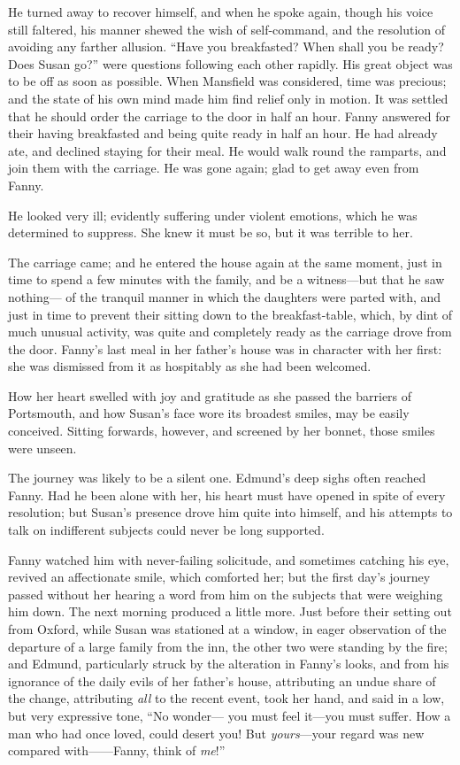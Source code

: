 \documentclass{article}
\newcommand{\gdash}{{---}{---}}
\begin{document}
He turned away to recover himself, and when he spoke again,
though his voice still faltered, his manner shewed
the wish of self-command, and the resolution of avoiding
any farther allusion.  ``Have you breakfasted?  When shall
you be ready?  Does Susan go?'' were questions following
each other rapidly.  His great object was to be off
as soon as possible.  When Mansfield was considered,
time was precious; and the state of his own mind made
him find relief only in motion.  It was settled that he
should order the carriage to the door in half an hour.
Fanny answered for their having breakfasted and being quite
ready in half an hour.  He had already ate, and declined
staying for their meal.  He would walk round the ramparts,
and join them with the carriage.  He was gone again;
glad to get away even from Fanny.

He looked very ill; evidently suffering under
violent emotions, which he was determined to suppress.
She knew it must be so, but it was terrible to her.

The carriage came; and he entered the house again at
the same moment, just in time to spend a few minutes with
the family, and be a witness---but that he saw nothing---%
of the tranquil manner in which the daughters were
parted with, and just in time to prevent their sitting
down to the breakfast-table, which, by dint of much
unusual activity, was quite and completely ready as
the carriage drove from the door.  Fanny's last meal
in her father's house was in character with her first:
she was dismissed from it as hospitably as she had been welcomed.

How her heart swelled with joy and gratitude as she
passed the barriers of Portsmouth, and how Susan's face
wore its broadest smiles, may be easily conceived.
Sitting forwards, however, and screened by her bonnet,
those smiles were unseen.

The journey was likely to be a silent one.  Edmund's deep
sighs often reached Fanny.  Had he been alone with her,
his heart must have opened in spite of every resolution;
but Susan's presence drove him quite into himself, and his
attempts to talk on indifferent subjects could never be
long supported.

Fanny watched him with never-failing solicitude,
and sometimes catching his eye, revived an affectionate smile,
which comforted her; but the first day's journey passed
without her hearing a word from him on the subjects
that were weighing him down.  The next morning produced
a little more.  Just before their setting out from Oxford,
while Susan was stationed at a window, in eager observation
of the departure of a large family from the inn,
the other two were standing by the fire; and Edmund,
particularly struck by the alteration in Fanny's looks,
and from his ignorance of the daily evils of her
father's house, attributing an undue share of the change,
attributing \emph{all} to the recent event, took her hand,
and said in a low, but very expressive tone, ``No wonder---%
you must feel it---you must suffer.  How a man who had
once loved, could desert you!  But \emph{yours}---your regard
was new compared with\gdash{}Fanny, think of \emph{me}!''
\end{document}
